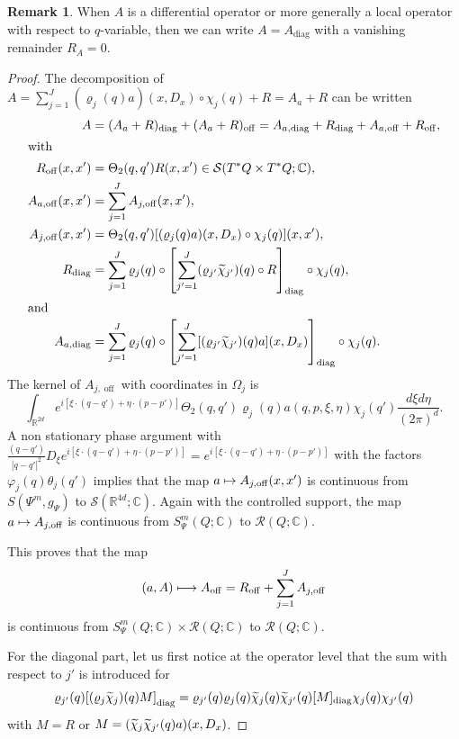 \documentclass[10pt]{amsart}
\theoremstyle{definition}\newtheorem{defi}[theo]{Definition}\newtheorem{rema}[theo]{Remark}\newtheorem{exam}[theo]{Example}\newtheorem{exem}[theo]{Example}\newtheorem{nota}[theo]{Notation}
\newcommand{\C}{\mathbb{C}}
\newcommand{\R}{\mathbb{R}}
\newcommand{\clS}{\mathcal{S}}
\newcommand{\clR}{\mathcal{R}}
\DeclareMathOperator{\offf}{off}
\DeclareMathOperator{\diag}{diag}
\let\oldtilde\tilde
\renewcommand*{\tilde}[1]{\mathchoice{\widetilde{#1}}{\widetilde{#1}}{\oldtilde{#1}}{\oldtilde{#1}}}
\let\originalleft\left
\let\originalright\right
\renewcommand{\left}{\mathopen{}\mathclose\bgroup\originalleft}
\renewcommand{\right}{\aftergroup\egroup\originalright}
\let\oldmapsto\mapsto
\renewcommand*{\mapsto}{\mathchoice{\longmapsto}{\oldmapsto}{\oldmapsto}{\oldmapsto}}
\begin{document}
\begin{rema}\label{re:local}
When $A$ is a differential operator or more generally a local operator with respect to $q$-variable, then we can write $A=A_{\diag}$ with a vanishing remainder $R_A=0$.
\end{rema}
\begin{proof}
The decomposition of $A=\sum_{j=1}^{J}(\varrho_{j}(q)a)(x,D_{x})\circ \chi_{j}(q)+R=A_{a}+R$ can be written
\begin{align*}
A&=(A_{a}+R)_{\diag}+(A_{a}+R)_{\offf}=A_{a,\diag}+R_{\diag}+A_{a,\offf}+R_{\offf},\\
\intertext{with} R_{\offf}(x,x')&=\Theta_{2}(q,q')R(x,x')\in \clS(T^{*}Q\times T^{*}Q;\C),\\
 A_{a,\offf}(x,x')&=\sum_{j=1}^{J}A_{j,\offf}(x,x'),\\
 A_{j,\offf}(x,x')&=\Theta_{2}(q,q')[(\varrho_{j}(q)a)(x,D_{x})\circ \chi_{j}(q)](x,x'),\\
 R_{\diag}&=\sum_{j=1}^{J}\varrho_{j}(q) \circ \left[\sum_{j'=1}^{J}(\varrho_{j'}\tilde{\chi}_{j'})(q)\circ R\right]_{\diag}\circ \chi_{j}(q),\\
\intertext{and} A_{a,\diag}&=
\sum_{j=1}^{J}\varrho_{j}(q)\circ \left[\sum_{j'=1}^{J}[(\varrho_{j'}\tilde{\chi}_{j'})(q)a](x,D_{x})\right]_{\diag}\circ \chi_{j}(q).
\end{align*}
The kernel of $A_{j,\offf}$ with coordinates in $\Omega_{j}$ is
\[
\int_{\R^{2d}}e^{i[\xi\cdot(q-q')+\eta\cdot(p-p')]}\Theta_{2}(q,q')\varrho_{j}(q)a(q,p,\xi,\eta)\chi_{j}(q') \frac{d\xi d\eta}{(2\pi)^{d}}.
\]
A non stationary phase argument with $\frac{(q-q')}{|q-q'|^{2}}D_{\xi}e^{i[\xi\cdot(q-q')+\eta\cdot(p-p')]}=e^{i[\xi
\cdot(q-q')+\eta\cdot(p-p')]}$ with the factors $\varphi_{j}(q)\theta_{j}(q')$ implies that the map $a\mapsto A_{j,\offf}(x,x')$ is continuous from $S(\Psi^{m},g_{\Psi})$ to $\clS(\R^{4d};\C)$. Again with the controlled support, the map $a\mapsto A_{j,\offf}$ is continuous from $S^{m}_{\Psi}(Q;\C)$ to $\clR(Q;\C)$.

This proves that the map
\[
(a,A)\mapsto A_{\offf}=R_{\offf}+\sum_{j=1}^{J}A_{j,\offf}
\]
is continuous from $S^{m}_{\Psi}(Q;\C)\times \clR(Q;\C)$ to $\clR(Q;\C)$.

For the diagonal part, let us first notice at the operator level that the sum with respect to $j'$ is introduced for
\[
\varrho_{j'}(q)\left[(\varrho_{j}\tilde{\chi}_{j})(q)M\right]_{\diag} =\varrho_{j'}(q)\varrho_{j}(q)\tilde{\chi}_{j}(q)\tilde{\chi}_{j'}(q)[M]_{\diag}\chi_{j}(q)\chi_{j'}(q)
\]
with $M=R$ or $M=(\tilde{\chi}_{j}\tilde{\chi}_{j'}(q)a)(x,D_{x})$.


\end{proof}
\end{document}
